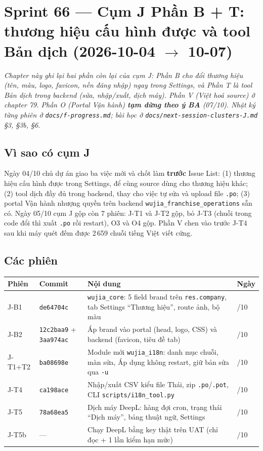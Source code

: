 \chapter{Sprint 66 --- Cụm J Phần B + T: thương hiệu cấu hình được và tool Bản dịch (2026-10-04 $\to$ 10-07)}

\emph{Chapter này ghi lại hai phần còn lại của cụm J: Phần B cho đổi thương hiệu (tên, màu, logo, favicon, nền đăng nhập) ngay
trong Settings, và Phần T là tool Bản dịch trong backend (sửa, nhập/xuất, dịch máy). Phần V (Việt hoá source) ở chapter 79.
Phần O (Portal Vận hành) \textbf{tạm dừng theo ý BA} (07/10). Nhật ký từng phiên ở \texttt{docs/f-progress.md}; bài học ở
\texttt{docs/next-session-clusters-J.md} §3, §3b, §6.}

\section{Vì sao có cụm J}

Ngày 04/10 chủ dự án giao ba việc mới và chốt làm \textbf{trước} Issue List:
(1) thương hiệu cấu hình được trong Settings, để cùng source dùng cho thương hiệu khác;
(2) tool dịch đầy đủ trong backend, thay cho việc tự sửa và upload file \texttt{.po};
(3) portal Vận hành nhượng quyền trên backend \texttt{wujia\_franchise\_operations} sẵn có.
Ngày 05/10 cụm J gộp còn 7 phiên: J-T1 và J-T2 gộp, bỏ J-T3 (chuỗi trong code đổi thì xuất \texttt{.po} rồi restart), O3 và O4 gộp.
Phần V chen vào trước J-T4 sau khi máy quét đếm được 2\,659 chuỗi tiếng Việt viết cứng.

\section{Các phiên}

\begin{center}
\footnotesize
\begin{tabularx}{\textwidth}{>{\raggedright\arraybackslash}p{1.3cm}>{\raggedright\arraybackslash}p{2.6cm}>{\raggedright\arraybackslash}X>{\raggedright\arraybackslash}p{1.1cm}}
\toprule
Phiên & Commit & Nội dung & Ngày \\
\midrule
J-B1 & \texttt{de64704c} & \texttt{wujia\_core}: 5 field brand trên \texttt{res.company}, tab Settings ``Thương hiệu'', route ảnh, bộ màu & 04/10 \\
J-B2 & \texttt{12c2baa9} + \texttt{3aa974ac} & Áp brand vào portal (head, logo, CSS) và backend (favicon, tiêu đề tab) & 04/10 \\
J-T1+T2 & \texttt{ba08698e} & Module mới \texttt{wujia\_i18n}: danh mục chuỗi, màn sửa, Áp dụng không restart, giữ bản sửa qua \texttt{-u} & 05/10 \\
J-T4 & \texttt{ca198ace} & Nhập/xuất CSV kiểu file Thái, zip \texttt{.po}/\texttt{.pot}, CLI \texttt{scripts/i18n\_tool.py} & 07/10 \\
J-T5 & \texttt{78a68ea5} & Dịch máy DeepL: hàng đợi cron, trạng thái ``Dịch máy'', bảng thuật ngữ, Settings & 07/10 \\
J-T5b & --- & Chạy DeepL bằng key thật trên UAT (chỉ đọc + 1 lần kiểm hạn mức) & 07/10 \\
\bottomrule
\end{tabularx}
\end{center}

